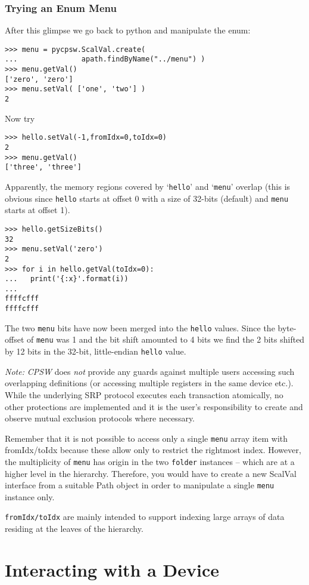 \documentclass[10pt]{article}
\newcommand{\ita}[1]{\emph{#1}}
\newcommand{\cpsw}      {\ita {CPSW}}
\newcommand{\Path}      {{Path}}
\newcommand{\py}        {python}
\newcommand{\cod}[1] {{\tt#1}}
\begin{document}
\subsubsection{Trying an Enum Menu}
After this glimpse we go back to \py{} and manipulate the enum:
\begin{verbatim}
>>> menu = pycpsw.ScalVal.create(
...               apath.findByName("../menu") )
>>> menu.getVal()
['zero', 'zero']
>>> menu.setVal( ['one', 'two'] )
2
\end{verbatim}
Now try
\begin{verbatim}
>>> hello.setVal(-1,fromIdx=0,toIdx=0)
2
>>> menu.getVal()
['three', 'three']
\end{verbatim}
Apparently, the memory regions covered by `\cod{hello}' and `\cod{menu}' overlap (this is
obvious since \cod{hello} starts at offset 0 with a size of 32-bits (default)
and \cod{menu} starts at offset 1).
\begin{verbatim}
>>> hello.getSizeBits()
32
>>> menu.setVal('zero')
2
>>> for i in hello.getVal(toIdx=0):
...   print('{:x}'.format(i))
...
ffffcfff
ffffcfff
\end{verbatim}
The two \cod{menu} bits have now been merged into the \cod{hello} values.
Since the byte-offset of \cod{menu} was 1 and the bit shift amounted to 4 bits
we find the 2 bits shifted by 12 bits in the 32-bit, little-endian
\cod{hello} value.

{\em Note:} \cpsw{} does {\em not} provide any guards against multiple users
accessing such overlapping definitions (or accessing multiple registers in the
same device etc.). While the underlying SRP protocol executes each transaction
atomically, no other protections are implemented and it is the user's responsibility
to create and observe mutual exclusion protocols where necessary.

Remember that it is not possible to access only a single \cod{menu} array item
with fromIdx/toIdx because these allow only to restrict the rightmost index.
However, the multiplicity of \cod{menu} has origin in the two \cod{folder} instances
-- which are at a higher level in the hierarchy. Therefore, you would have to create a
new ScalVal interface from a suitable \Path{} object in order to manipulate
a single \cod{menu} instance only.

\cod{fromIdx/toIdx} are mainly intended to support indexing large arrays of data
residing at the leaves of the hierarchy.

\section{Interacting with a Device}
\end{document}
